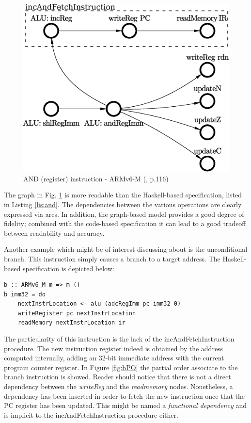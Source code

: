 \documentclass[conference]{IEEEtran}
\begin{document}
\begin{figure}[ht!]
\begin{center}
	\includegraphics[width=\linewidth]{IMG/and_RegT1.eps}
	\caption{AND (register) instruction - ARMv6-M (\cite{armManual}, p.116)}
	\label{fig:andPO}
\end{center}
\end{figure}

The graph in Fig. \ref{fig:andPO} is more readable than the Haskell-based specification,
listed in Listing \ref{lis:and}. The dependencies between the various operations are
clearly expressed via arcs. In addition, the graph-based model provides a good degree
of fidelity; combined with the code-based specification it can lead to a good tradeoff
between readability and accuracy.

Another example which might be of interest discussing about is the unconditional branch. This
instruction simply causes a branch to a target address. The Haskell-based specification is
depicted below:\\

\begin{lstlisting}[caption=B instruction - Haskell-based specification,
frame=single, label=lis:and]
b :: ARMv6_M m => m ()
b imm32 = do
    nextInstrLocation <- alu (adcRegImm pc imm32 0)
    writeRegister pc nextInstrLocation
    readMemory nextInstrLocation ir
\end{lstlisting}

\noindent
The particularity of this instruction is the lack of the incAndFetchInstruction procedure.
The new instruction register indeed is obtained by the address computed internally, adding an
32-bit immediate address with the current program counter register. In Figure \ref{fig:bPO}
the partial order associate to the branch instruction is showed. Reader should notice that
there is not a direct dependency between the \textit{writeReg} and the \textit{readmemory}
nodes. Nonetheless, a dependency has been inserted in order to fetch the new instruction once
that the PC register has been updated. This might be named a \textit{functional dependency}
and is implicit to the incAndFetchInstruction procedure either.
\end{document}
